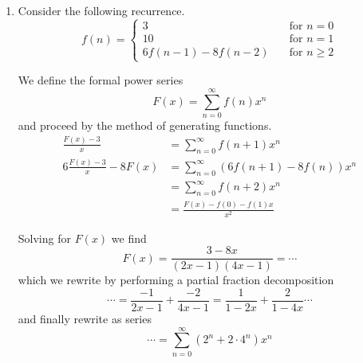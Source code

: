 \documentclass[11pt]{article}
\begin{document}

\begin{enumerate}
    \item
        Consider the following recurrence.
        \begin{equation*}
            f(n) = \begin{cases}
                3   &\quad\text{for } n = 0 \\
                10  &\quad\text{for } n = 1 \\
                6f(n-1) - 8f(n-2)
                    &\quad\text{for } n \geq 2
            \end{cases}
        \end{equation*}

        We define the formal power series
        \begin{equation*}
            F(x) = \sum_{n=0}^\infty f(n)x^n
        \end{equation*}
        and proceed by the method of generating functions.
        \begin{align*}
            \frac{F(x) - 3}{x} &= \sum_{n=0}^\infty f(n+1) x^n \\
            6 \frac{F(x) - 3}{x} - 8 F(x)
                &= \sum_{n=0}^\infty (6 f(n+1) - 8 f(n)) x^n \\
                &= \sum_{n=0}^\infty f(n+2) x^n \\
                &= \frac{F(x) - f(0) - f(1) x}{x^2}
        \end{align*}

        Solving for $F(x)$ we find
        \begin{equation*}
            F(x) = \frac{3 - 8x}{(2x-1)(4x-1)} = \cdots
        \end{equation*}
        which we rewrite by performing a partial fraction decomposition
        \begin{equation*}
            \cdots
            =
            \frac{-1}{2x-1} + \frac{-2}{4x - 1}
            =
            \frac{1}{1-2x} + \frac{2}{1-4x}
            \cdots
        \end{equation*}
        and finally rewrite as series
        \begin{equation*}
            \cdots
            =
            \sum_{n=0}^\infty{
                (2^n + 2 \cdot 4^n)x^n
            }
        \end{equation*}


\end{enumerate}
\end{document}
